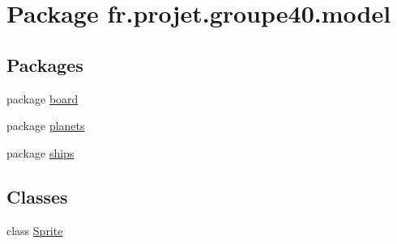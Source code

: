 \hypertarget{namespacefr_1_1projet_1_1groupe40_1_1model}{}\section{Package fr.\+projet.\+groupe40.\+model}
\label{namespacefr_1_1projet_1_1groupe40_1_1model}
\subsection*{Packages}
\begin{DoxyCompactItemize}
\item 
package \hyperlink{namespacefr_1_1projet_1_1groupe40_1_1model_1_1board}{board}
\item 
package \hyperlink{namespacefr_1_1projet_1_1groupe40_1_1model_1_1planets}{planets}
\item 
package \hyperlink{namespacefr_1_1projet_1_1groupe40_1_1model_1_1ships}{ships}
\end{DoxyCompactItemize}
\subsection*{Classes}
\begin{DoxyCompactItemize}
\item 
class \hyperlink{classfr_1_1projet_1_1groupe40_1_1model_1_1_sprite}{Sprite}
\end{DoxyCompactItemize}
